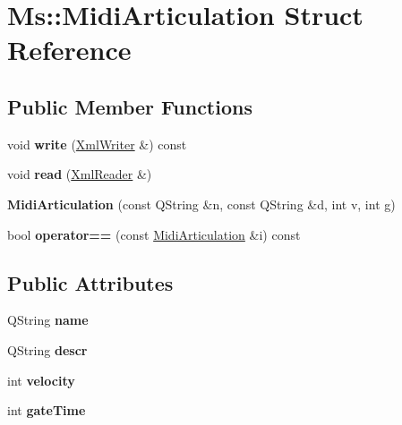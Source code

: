 \hypertarget{struct_ms_1_1_midi_articulation}{}\section{Ms\+:\+:Midi\+Articulation Struct Reference}
\label{struct_ms_1_1_midi_articulation}
\subsection*{Public Member Functions}
\begin{DoxyCompactItemize}
\item 
\mbox{\label{struct_ms_1_1_midi_articulation_a22f51fc307b5294320bb7e28ba3c80c8}} 
void {\bfseries write} (\hyperlink{class_ms_1_1_xml_writer}{Xml\+Writer} \&) const
\item 
\mbox{\label{struct_ms_1_1_midi_articulation_ab96c35b3b140c7f6699ba9502e3ed5b4}} 
void {\bfseries read} (\hyperlink{class_ms_1_1_xml_reader}{Xml\+Reader} \&)
\item 
\mbox{\label{struct_ms_1_1_midi_articulation_a7de841b962ff5cfd37094850373a5b87}} 
{\bfseries Midi\+Articulation} (const Q\+String \&n, const Q\+String \&d, int v, int g)
\item 
\mbox{\label{struct_ms_1_1_midi_articulation_a07d0e9feb909e9f9b9ebbd8e70d868f8}} 
bool {\bfseries operator==} (const \hyperlink{struct_ms_1_1_midi_articulation}{Midi\+Articulation} \&i) const
\end{DoxyCompactItemize}
\subsection*{Public Attributes}
\begin{DoxyCompactItemize}
\item 
\mbox{\label{struct_ms_1_1_midi_articulation_aac4ac2f79341432354bbbe9c09fbd483}} 
Q\+String {\bfseries name}
\item 
\mbox{\label{struct_ms_1_1_midi_articulation_a7c994c8b1f26a7aa1beee7ed96425ed3}} 
Q\+String {\bfseries descr}
\item 
\mbox{\label{struct_ms_1_1_midi_articulation_ae5477555ae37ccb1fdf414a575dce1f5}} 
int {\bfseries velocity}
\item 
\mbox{\label{struct_ms_1_1_midi_articulation_a8b37ec9815ccd6817becc83de79a28fa}} 
int {\bfseries gate\+Time}
\end{DoxyCompactItemize}


